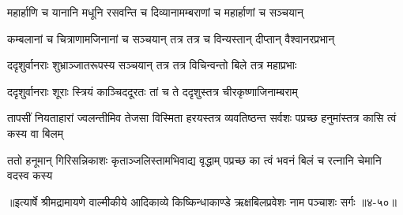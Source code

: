 \twolineshloka
{महार्हाणि च यानानि मधूनि रसवन्ति च}
{दिव्यानामम्बराणां च महार्हाणां च सञ्चयान्} %

\twolineshloka
{कम्बलानां च चित्राणामजिनानां च सञ्चयान्}
{तत्र तत्र च विन्यस्तान् दीप्तान् वैश्वानरप्रभान्} %

\twolineshloka
{ददृशुर्वानराः शुभ्राञ्जातरूपस्य सञ्चयान्}
{तत्र तत्र विचिन्वन्तो बिले तत्र महाप्रभाः} %

\twolineshloka
{ददृशुर्वानराः शूराः स्त्रियं काञ्चिददूरतः}
{तां च ते ददृशुस्तत्र चीरकृष्णाजिनाम्बराम्} %

\threelineshloka
{तापसीं नियताहारां ज्वलन्तीमिव तेजसा}
{विस्मिता हरयस्तत्र व्यवतिष्ठन्त सर्वशः}
{पप्रच्छ हनुमांस्तत्र कासि त्वं कस्य वा बिलम्} %

\twolineshloka
{ततो हनूमान् गिरिसन्निकाशः कृताञ्जलिस्तामभिवाद्य वृद्धाम्}
{पप्रच्छ का त्वं भवनं बिलं च रत्नानि चेमानि वदस्व कस्य} %


॥इत्यार्षे श्रीमद्रामायणे वाल्मीकीये आदिकाव्ये किष्किन्धाकाण्डे ऋक्षबिलप्रवेशः नाम पञ्चाशः सर्गः ॥४-५०॥

